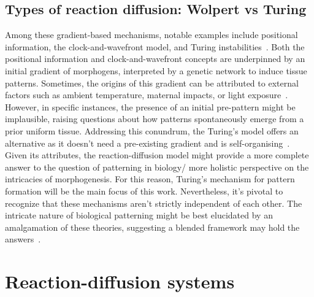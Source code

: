 \subsection{Types of reaction diffusion: Wolpert vs Turing} %
Among these gradient-based mechanisms, notable examples include positional information, the clock-and-wavefront model, and Turing instabilities~\parencite{Wolpert1969, Baker2006, Turing1952}.
Both the positional information and clock-and-wavefront concepts are underpinned by an initial gradient of morphogens, interpreted by a genetic network to induce tissue patterns.
Sometimes, the origins of this gradient can be attributed to external factors such as ambient temperature, maternal impacts, or light exposure~\parencite{Schier2009}.
However, in specific instances, the presence of an initial pre-pattern might be implausible, raising questions about how patterns spontaneously emerge from a prior uniform tissue.
Addressing this conundrum, the Turing's model offers an alternative as it doesn't need a pre-existing gradient and is self-organising~\parencite{Kondo2010a}. %
Given its attributes, the reaction-diffusion model might provide a more complete answer to the question of patterning in biology/ more holistic perspective on the intricacies of morphogenesis.
For this reason, Turing's mechanism for pattern formation will be the main focus of this work.
Nevertheless, it's pivotal to recognize that these mechanisms aren't strictly independent of each other.
The intricate nature of biological patterning might be best elucidated by an amalgamation of these theories, suggesting a blended framework may hold the answers~\parencite{Green2015}. %


\section{Reaction-diffusion systems}

